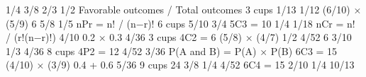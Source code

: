 \answerkey
{} 1/4
 3/8
 2/3
 1/2
 Favorable outcomes / Total outcomes
 3 cups
 1/13
 1/12
 (6/10) × (5/9)
 6
 5/8
 1/5
 nPr = n! / (n−r)!
 6 cups
 5/10
 3/4
 5C3 = 10
 1/4
 1/18
 nCr = n! / (r!(n−r)!)
 4/10
 0.2 × 0.3
 4/36
 3 cups
 4C2 = 6
 (5/8) × (4/7)
 1/2
 4/52
 6
 3/10
 1/3
 4/36
 8 cups
 4P2 = 12
 4/52
 3/36
 P(A and B) = P(A) × P(B)
 6C3 = 15
 (4/10) × (3/9)
 0.4 + 0.6
 5/36
 9 cups
 24
 3/8
 1/4
 4/52
 6C4 = 15
 2/10
 1/4
 10/13
\endanswerkey